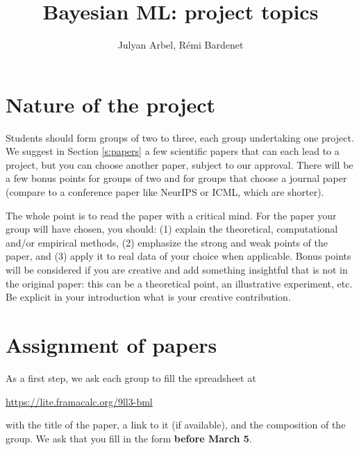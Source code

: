 \documentclass[12pt]{article}%
\begin{document}
\title{Bayesian ML: project topics}
\author{Julyan Arbel, R\'emi Bardenet}
\maketitle

\section{Nature of the project}
Students should form groups of two to three, each group undertaking one project.
We suggest in Section \ref{s:papers} a few scientific papers that can each lead to a project, but you can choose another paper, subject to our approval.
There will be a few bonus points for groups of two and for groups that choose a journal paper (compare to a conference paper like NeurIPS or ICML, which are shorter).

The whole point is to read the paper with a critical mind. For the paper your group will have chosen, you should: (1) explain the theoretical, computational and/or empirical methods, (2) emphasize the strong and weak points of the paper, and (3) apply it to real data of your choice when applicable. Bonus points will be considered if you are creative and add something insightful that is not in the original paper: this can be a theoretical point, an illustrative experiment, etc. Be explicit in your introduction what is your creative contribution.

\section{Assignment of papers}
As a first step, we ask each group to fill the spreadsheet at
\begin{center}
   \href{https://lite.framacalc.org/9ll3-bml}{https://lite.framacalc.org/9ll3-bml}
 \end{center}
with the title of the paper, a link to it (if available), and the composition of the group.
We ask that you fill in the form {\bf before March 5}. %
\end{document}
